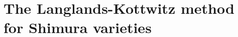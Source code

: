 \chapter{The Langlands-Kottwitz method for Shimura varieties}
    \begin{abstract}
            
    \end{abstract}
    
    \minitoc